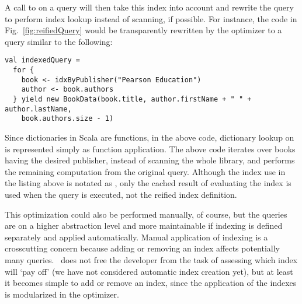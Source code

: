 
A call to  on a query will then take this index into account and rewrite the query to perform index lookup instead of scanning, if possible. For instance, the code in Fig.~\ref{fig:reifiedQuery} would be transparently rewritten by the optimizer to a query similar to the following:
\begin{lstlisting}
val indexedQuery =
  for {
    book <- idxByPublisher("Pearson Education")
    author <- book.authors
  } yield new BookData(book.title, author.firstName + " " + author.lastName,
    book.authors.size - 1)
\end{lstlisting}
Since dictionaries in Scala are functions, in the above code, dictionary lookup on  is represented simply as function application. The above code iterates over books having the desired publisher, instead of scanning the whole library, and performs the remaining computation from the original query. Although the index use in the listing above is notated as 
, only the cached result of evaluating the index is used when
the query is executed, not the reified index definition.

This optimization could also be performed manually, of course, but the queries are on a higher abstraction level and more maintainable if indexing is defined separately and applied automatically.
Manual application of indexing is a crosscutting concern because adding or removing an index affects potentially many queries.
\LoS\ does not free the developer from the task of assessing which index will `pay off' (we have not considered
automatic index creation yet), but at least it becomes simple to add or remove an index, since the application
of the indexes is modularized in the optimizer.


